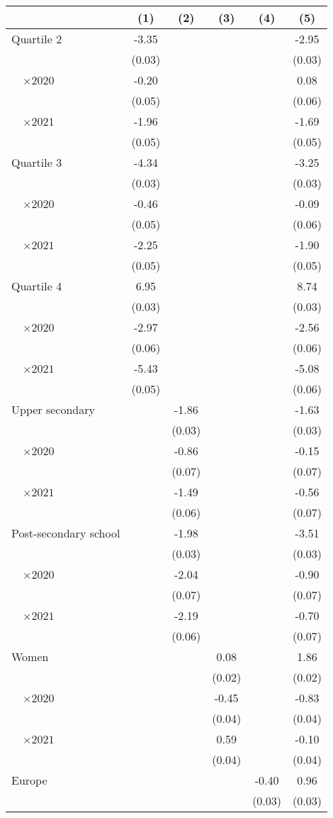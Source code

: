 
\begin{tabular}{@{}l*{5}{S[table-format={-}2.2{\tnote{***}}]}@{}}
\toprule
{} & {(1)} & {(2)} & {(3)} & {(4)} & {(5)}\tabularnewline%
\midrule
Quartile 2 & -3.35\tnote{***} &  &  &  & -2.95\tnote{***}\tabularnewline%
 & (0.03) &  &  &  & \vphantom{2} (0.03)\tabularnewline%
~~\(\times 2020\) & -0.20\tnote{***} &  &  &  & 0.08\tabularnewline%
 & (0.05) &  &  &  & \vphantom{2} (0.06)\tabularnewline%
~~\(\times 2021\) & -1.96\tnote{***} &  &  &  & -1.69\tnote{***}\tabularnewline%
 & (0.05) &  &  &  & \vphantom{1} (0.05)\tabularnewline%
Quartile 3 & -4.34\tnote{***} &  &  &  & -3.25\tnote{***}\tabularnewline%
 & (0.03) &  &  &  & \vphantom{1} (0.03)\tabularnewline%
~~\(\times 2020\) & -0.46\tnote{***} &  &  &  & -0.09\tabularnewline%
 & (0.05) &  &  &  & \vphantom{1} (0.06)\tabularnewline%
~~\(\times 2021\) & -2.25\tnote{***} &  &  &  & -1.90\tnote{***}\tabularnewline%
 & (0.05) &  &  &  & (0.05)\tabularnewline%
Quartile 4 & 6.95\tnote{***} &  &  &  & 8.74\tnote{***}\tabularnewline%
 & (0.03) &  &  &  & (0.03)\tabularnewline%
~~\(\times 2020\) & -2.97\tnote{***} &  &  &  & -2.56\tnote{***}\tabularnewline%
 & (0.06) &  &  &  & (0.06)\tabularnewline%
~~\(\times 2021\) & -5.43\tnote{***} &  &  &  & -5.08\tnote{***}\tabularnewline%
 & (0.05) &  &  &  & (0.06)\tabularnewline%
Upper secondary &  & -1.86\tnote{***} &  &  & -1.63\tnote{***}\tabularnewline%
 &  & (0.03) &  &  & \vphantom{1} (0.03)\tabularnewline%
~~\(\times 2020\) &  & -0.86\tnote{***} &  &  & -0.15\tnote{*}\tabularnewline%
 &  & (0.07) &  &  & \vphantom{1} (0.07)\tabularnewline%
~~\(\times 2021\) &  & -1.49\tnote{***} &  &  & -0.56\tnote{***}\tabularnewline%
 &  & (0.06) &  &  & \vphantom{1} (0.07)\tabularnewline%
Post-secondary school &  & -1.98\tnote{***} &  &  & -3.51\tnote{***}\tabularnewline%
 &  & (0.03) &  &  & (0.03)\tabularnewline%
~~\(\times 2020\) &  & -2.04\tnote{***} &  &  & -0.90\tnote{***}\tabularnewline%
 &  & (0.07) &  &  & (0.07)\tabularnewline%
~~\(\times 2021\) &  & -2.19\tnote{***} &  &  & -0.70\tnote{***}\tabularnewline%
 &  & (0.06) &  &  & (0.07)\tabularnewline%
Women &  &  & 0.08\tnote{***} &  & 1.86\tnote{***}\tabularnewline%
 &  &  & (0.02) &  & (0.02)\tabularnewline%
~~\(\times 2020\) &  &  & -0.45\tnote{***} &  & -0.83\tnote{***}\tabularnewline%
 &  &  & (0.04) &  & \vphantom{1} (0.04)\tabularnewline%
~~\(\times 2021\) &  &  & 0.59\tnote{***} &  & -0.10\tnote{*}\tabularnewline%
 &  &  & (0.04) &  & (0.04)\tabularnewline%
Europe &  &  &  & -0.40\tnote{***} & 0.96\tnote{***}\tabularnewline%
 &  &  &  & (0.03) & \vphantom{1} (0.03)\tabularnewline%

\end{tabular}

